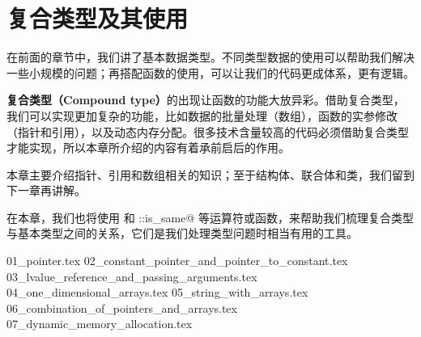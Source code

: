 \chapter{复合类型及其使用}
在前面的章节中，我们讲了基本数据类型。不同类型数据的使用可以帮助我们解决一些小规模的问题；再搭配函数的使用，可以让我们的代码更成体系，更有逻辑。\par
\textbf{复合类型（Compound type）}的出现让函数的功能大放异彩。借助复合类型，我们可以实现更加复杂的功能，比如数据的批量处理（数组），函数的实参修改（指针和引用），以及动态内存分配。很多技术含量较高的代码必须借助复合类型才能实现，所以本章所介绍的内容有着承前启后的作用。\par
本章主要介绍指针、引用和数组相关的知识；至于结构体、联合体和类，我们留到下一章再讲解。\par
在本章，我们也将使用 \lstinline@typeid@ 和 \lstinline@std::is_same@ 等运算符或函数，来帮助我们梳理复合类型与基本类型之间的关系，它们是我们处理类型问题时相当有用的工具。\par
{01_pointer.tex}
{02_constant_pointer_and_pointer_to_constant.tex}
{03_lvalue_reference_and_passing_arguments.tex}
{04_one_dimensional_arrays.tex}
{05_string_with_arrays.tex}
{06_combination_of_pointers_and_arrays.tex}
{07_dynamic_memory_allocation.tex}